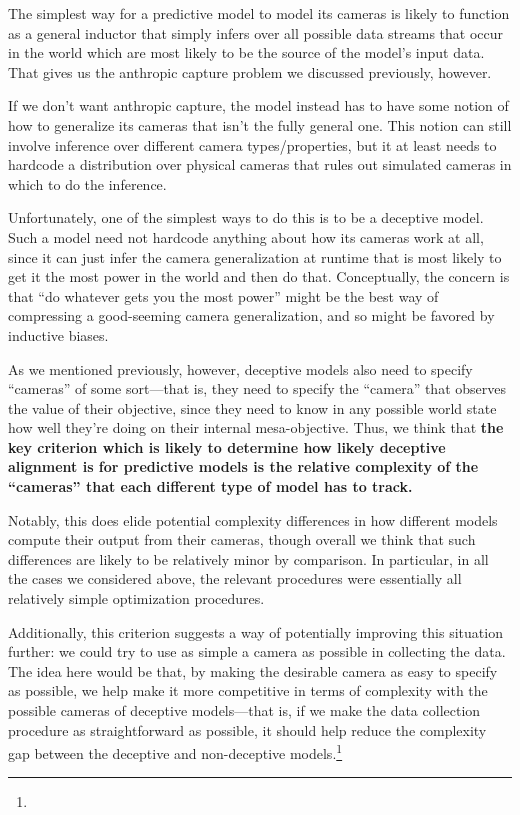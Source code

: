 {The simplest way for a predictive model to model its cameras is likely to function as a general inductor that simply infers over all possible data streams that occur in the world which are most likely to be the source of the model's input data. That gives us the anthropic capture problem we discussed previously\cite{TODO: cite TODO}, however.

If we don't want anthropic capture, the model instead has to have some notion of how to generalize its cameras that isn't the fully general one. This notion can still involve inference over different camera types/properties, but it at least needs to hardcode a distribution over physical cameras that rules out simulated cameras in which to do the inference.

Unfortunately, one of the simplest ways to do this is to be a deceptive model. Such a model need not hardcode anything about how its cameras work at all, since it can just infer the camera generalization at runtime that is most likely to get it the most power in the world and then do that. Conceptually, the concern is that ``do whatever gets you the most power'' might be the best way of compressing a good-seeming camera generalization, and so might be favored by inductive biases.

As we mentioned previously, however, deceptive models also need to specify ``cameras'' of some sort---that is, they need to specify the ``camera'' that observes the value of their objective, since they need to know in any possible world state how well they're doing on their internal mesa-objective. Thus, we think that \textbf{the key criterion which is likely to determine how likely deceptive alignment is for predictive models is the relative complexity of the ``cameras'' that each different type of model has to track.}

Notably, this does elide potential complexity differences in how different models compute their output from their cameras, though overall we think that such differences are likely to be relatively minor by comparison. In particular, in all the cases we considered above, the relevant procedures were essentially all relatively simple optimization procedures.

Additionally, this criterion suggests a way of potentially improving this situation further: we could try to use as simple a camera as possible in collecting the data. The idea here would be that, by making the desirable camera as easy to specify as possible, we help make it more competitive in terms of complexity with the possible cameras of deceptive models---that is, if we make the data collection procedure as straightforward as possible, it should help reduce the complexity gap between the deceptive and non-deceptive models.\footnote{}


}
